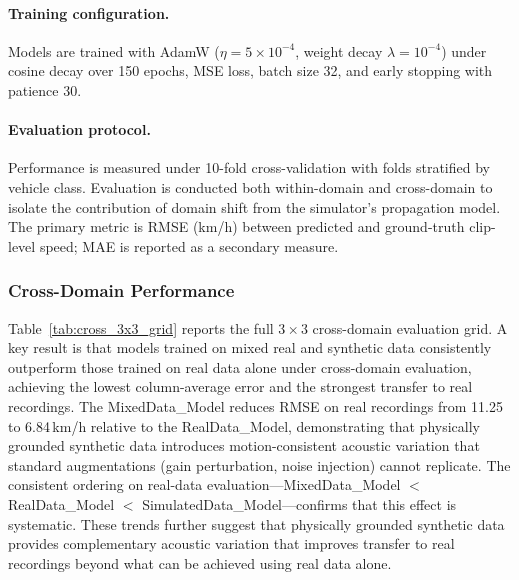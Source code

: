 \documentclass{article}
\begin{document}
\paragraph{Training configuration.} Models are trained with AdamW ($\eta = 5 \times 10^{-4}$, weight decay $\lambda = 10^{-4}$) under cosine decay over 150 epochs, MSE loss, batch size 32, and early stopping with patience 30.

\paragraph{Evaluation protocol.} Performance is measured under 10-fold cross-validation with folds stratified by vehicle class. Evaluation is conducted both within-domain and cross-domain to isolate the contribution of domain shift from the simulator's propagation model. The primary metric is RMSE (km/h) between predicted and ground-truth clip-level speed; MAE is reported as a secondary measure.

\subsubsection{Cross-Domain Performance}
\label{sec:cross-domain}

\begin{table}[H]
\centering
\caption{Cross-dataset inference RMSE (km/h): 3$\times$3 grid of 
evaluation dataset vs.\ model training condition. Each cell is averaged 
across all vehicles.}
\label{tab:cross_3x3_grid}
\renewcommand{\arraystretch}{1.40}
\end{table}

Table~\ref{tab:cross_3x3_grid} reports the full $3 \times 3$ cross-domain evaluation grid. A key result is that models trained on mixed real and synthetic data consistently outperform those trained on real data alone under cross-domain evaluation, achieving the lowest column-average error and the strongest transfer to real recordings. The MixedData\_Model reduces RMSE on real recordings from 11.25 to 6.84\,km/h relative to the RealData\_Model, demonstrating that physically grounded synthetic data introduces motion-consistent acoustic variation that standard augmentations (gain perturbation, noise injection) cannot replicate. The consistent ordering on real-data evaluation---MixedData\_Model $<$ RealData\_Model $<$ SimulatedData\_Model---confirms that this effect is systematic. These trends further suggest that physically grounded synthetic data provides complementary acoustic variation that improves transfer to real recordings beyond what can be achieved using real data alone.
\end{document}
